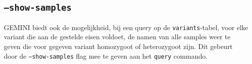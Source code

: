 \subsection{\texttt{--show-samples}}

GEMINI biedt ook de mogelijkheid, bij een query op de \texttt{variants}-tabel, voor elke variant die aan de gestelde eisen voldoet, de namen van alle samples weer te geven die voor gegeven variant homozygoot of heterozygoot zijn. Dit gebeurt door de \texttt{--show-samples} flag mee te geven aan het \texttt{query} commando.



